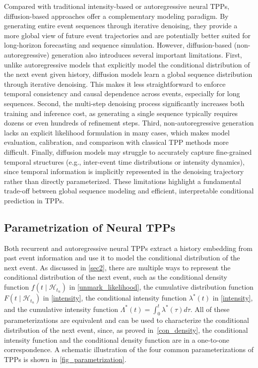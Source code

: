 \documentclass[10pt]{article} %
\begin{document}
Compared with traditional intensity-based or autoregressive neural TPPs, diffusion-based approaches offer a complementary modeling paradigm. By generating entire event sequences through iterative denoising, they provide a more global view of future event trajectories and are potentially better suited for long-horizon forecasting and sequence simulation. 
However, diffusion-based (non-autoregressive) generation also introduces several important limitations. 
First, unlike autoregressive models that explicitly model the conditional distribution of the next event given history, diffusion models learn a global sequence distribution through iterative denoising. This makes it less straightforward to enforce temporal consistency and causal dependence across events, especially for long sequences. 
Second, the multi-step denoising process significantly increases both training and inference cost, as generating a single sequence typically requires dozens or even hundreds of refinement steps. 
Third, non-autoregressive generation lacks an explicit likelihood formulation in many cases, which makes model evaluation, calibration, and comparison with classical TPP methods more difficult. 
Finally, diffusion models may struggle to accurately capture fine-grained temporal structures (e.g., inter-event time distributions or intensity dynamics), since temporal information is implicitly represented in the denoising trajectory rather than directly parameterized. 
These limitations highlight a fundamental trade-off between global sequence modeling and efficient, interpretable conditional prediction in TPPs. 




\subsection{Parametrization of Neural TPPs}
\label{parametrization}
Both recurrent and autoregressive neural TPPs extract a history embedding from past event information and use it to model the conditional distribution of the next event.  
As discussed in \cref{sec2}, there are multiple ways to represent the conditional distribution of the next event, such as the conditional density function \(f(t \mid \mathcal{H}_{t_n})\) in \cref{unmark_likelihood}, the cumulative distribution function \(F(t \mid \mathcal{H}_{t_n})\) in \cref{intensity}, the conditional intensity function \(\lambda^*(t)\) in \cref{intensity}, and the cumulative intensity function \(\Lambda^*(t) = \int_0^t \lambda^*(\tau)d\tau\).  
All of these parameterizations are equivalent and can be used to characterize the conditional distribution of the next event, since, as proved in~\cref{con_density}, the conditional intensity function and the conditional density function are in a one-to-one correspondence. 
A schematic illustration of the four common parameterizations of TPPs is shown in \cref{fig_parametrization}. 
\end{document}
